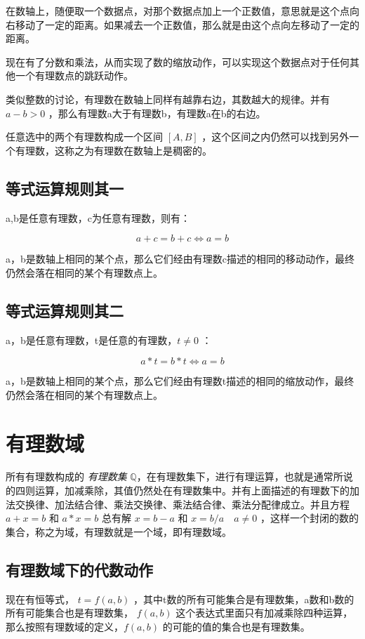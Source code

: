 \documentclass[12pt,oneside]{book}
\begin{document}
在数轴上，随便取一个数据点，对那个数据点加上一个正数值，意思就是这个点向右移动了一定的距离。如果减去一个正数值，那么就是由这个点向左移动了一定的距离。

现在有了分数和乘法，从而实现了数的缩放动作，可以实现这个数据点对于任何其他一个有理数点的跳跃动作。

类似整数的讨论，有理数在数轴上同样有越靠右边，其数越大的规律。并有 $a-b>0$ ，那么有理数a大于有理数b，有理数a在b的右边。

任意选中的两个有理数构成一个区间 $[A, B]$ ，这个区间之内仍然可以找到另外一个有理数，这称之为有理数在数轴上是稠密的。


\subsection{等式运算规则其一}
a,b是任意有理数，c为任意有理数，则有：

\begin{equation}
a+c = b+c \Leftrightarrow a=b
\end{equation}

a，b是数轴上相同的某个点，那么它们经由有理数c描述的相同的移动动作，最终仍然会落在相同的某个有理数点上。


\subsection{等式运算规则其二}
a，b是任意有理数，t是任意的有理数，$t \neq 0$ ：

\begin{equation}
a*t=b*t \Leftrightarrow a=b
\end{equation}

a，b是数轴上相同的某个点，那么它们经由有理数t描述的相同的缩放动作，最终仍然会落在相同的某个有理数点上。

\section{有理数域}
所有有理数构成的 \emph{有理数集}  $ \mathbb{Q} $，在有理数集下，进行有理运算，也就是通常所说的四则运算，加减乘除，其值仍然处在有理数集中。并有上面描述的有理数下的加法交换律、加法结合律、乘法交换律、乘法结合律、乘法分配律成立。并且方程 $a + x = b$ 和 $a*x=b$ 总有解 $x = b-a$ 和 $x = b/a \quad a\neq 0$ ，这样一个封闭的数的集合，称之为域，有理数就是一个域，即有理数域。

 
\subsection{有理数域下的代数动作}
现在有恒等式， $t=f(a, b)$ ，其中t数的所有可能集合是有理数集，a数和b数的所有可能集合也是有理数集， $f(a,b)$ 这个表达式里面只有加减乘除四种运算，那么按照有理数域的定义，$f(a,b)$ 的可能的值的集合也是有理数集。
\end{document}
